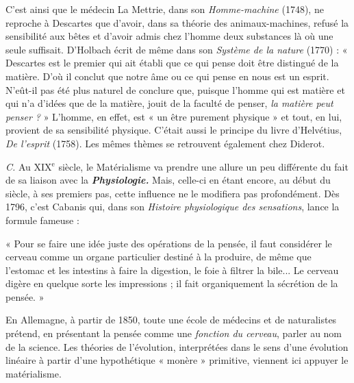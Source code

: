 \vspace{0.24cm}
{\footnotesize C'est ainsi que le médecin La Mettrie, dans son {\it Homme-machine} (1748),
ne reproche à Descartes que d’avoir, dans sa théorie des animaux-machines,
refusé la sensibilité aux bêtes et d’avoir admis chez l'homme deux substances
là où une seule suffisait. D'Holbach écrit de même dans son {\it Système
de la nature} (1770) : « Descartes est le premier qui ait établi que ce qui
pense doit être distingué de la matière. D'où il conclut que notre âme ou
ce qui pense en nous est un esprit. N’eût-il pas été plus naturel de conclure
que, puisque l’homme qui est matière et qui n’a d’idées que de la matière,
jouit de la faculté de penser, {\it la matière peut penser ?} » L'homme, en effet,
est « un être purement physique » et tout, en lui, provient de sa sensibilité
physique. C'était aussi le principe du livre d'Helvétius, {\it De l'esprit} (1758).
Les mêmes thèmes se retrouvent également chez Diderot.}
\vspace{0.31cm}


{\it C.} Au {\footnotesize XIX}$^\text{e}$ siècle, le Matérialisme va prendre une allure un peu
différente du fait de sa liaison avec la \textbf{\textit {Physiologie.}} Mais, celle-ci en
étant encore, au début du siècle, à ses premiers pas, cette influence
ne le modifiera pas profondément. Dès 1796, c’est Cabanis qui, dans
son {\it Histoire physiologique des sensations}, lance la formule fameuse :

\vspace{0.24cm}
{\footnotesize « Pour se faire une idée juste des opérations de la pensée, il faut considérer
le cerveau comme un organe particulier destiné à la produire, de
même que l’estomac et les intestins à faire la digestion, le foie à filtrer la
bile... Le cerveau digère en quelque sorte les impressions ; il fait organiquement
la sécrétion de la pensée. »}
\vspace{0.31cm}


En Allemagne, à partir de 1850, toute une école de médecins et
de naturalistes prétend, en présentant la pensée comme une {\it fonction
du cerveau}, parler au nom de la science. Les théories de l’évolution,
interprétées dans le sens d’une évolution linéaire à partir d’une hypothétique
« monère » primitive, viennent ici appuyer le matérialisme.

